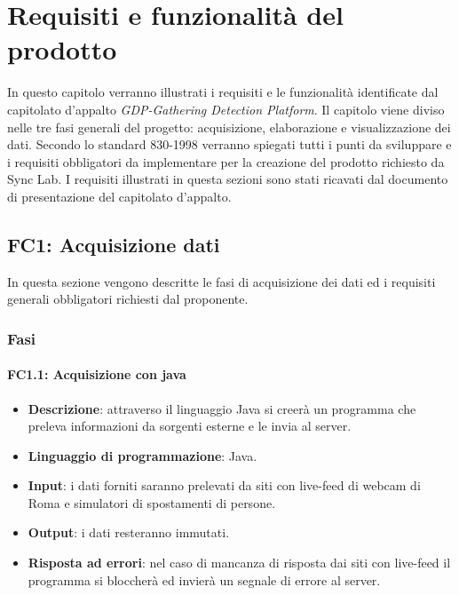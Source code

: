 \chapter{Requisiti e funzionalità del prodotto}
In questo capitolo verranno illustrati i requisiti e le funzionalità identificate dal capitolato d'appalto \textit{GDP-Gathering Detection Platform}. Il capitolo viene diviso nelle tre fasi generali del progetto: acquisizione, elaborazione e visualizzazione dei dati. Secondo lo standard 830-1998 verranno spiegati tutti i punti da sviluppare e i requisiti obbligatori da implementare per la creazione del prodotto richiesto da Sync Lab. I requisiti illustrati in questa sezioni sono stati ricavati dal documento di presentazione del capitolato d'appalto. %

\section{FC1: Acquisizione dati}%
In questa sezione vengono descritte le fasi di acquisizione dei dati ed i requisiti generali obbligatori richiesti dal proponente.

\subsection{Fasi}

\subsubsection{FC1.1: Acquisizione con java}

\begin{itemize}
	\item \textbf{Descrizione}: attraverso il linguaggio Java si creerà un programma che preleva informazioni da sorgenti esterne e le invia al server.
	\item \textbf{Linguaggio di programmazione}: Java.
	\item \textbf{Input}: i dati forniti saranno prelevati da siti con live-feed di webcam di Roma e simulatori di spostamenti di persone.
	\item \textbf{Output}: i dati resteranno immutati.
	\item \textbf{Risposta ad errori}: nel caso di mancanza di risposta dai siti con live-feed il programma si bloccherà ed invierà un segnale di errore al server.
\end{itemize}


